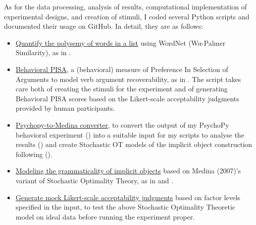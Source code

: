 As for the data processing, analysis of results, computational implementation of experimental designs, and creation of stimuli, I coded several Python scripts and documented their usage on GitHub. In detail, they are as follows:
\begin{itemize}    
    \item \href{https://github.com/giuliacappelli/checkPolysemy}{Quantify the polysemy of words in a list} using WordNet (Wu-Palmer Similarity), as in .
    \item \href{https://github.com/giuliacappelli/behavioralPISA}{Behavioral PISA}, a (behavioral) measure of Preference In Selection of Arguments to model verb argument recoverability, as in . The script takes care both of creating the stimuli for the experiment and of generating Behavioral PISA scores based on the Likert-scale acceptability judgments provided by human participants.
    \item \href{https://github.com/giuliacappelli/PsychopyToMedina}{Psychopy-to-Medina converter}, to convert the output of my PsychoPy behavioral experiment () into a suitable input for my scripts to analyse the results () and create Stochastic OT models of the implicit object construction following \textcite{Medina2007} ().
    \item \href{https://github.com/giuliacappelli/MedinaStochasticOptimalityTheory}{Modeling the grammaticality of implicit objects} based on Medina (2007)'s variant of Stochastic Optimality Theory, as in  and .
    \item \href{https://github.com/giuliacappelli/generateMockLikertGrammaticalityJudgments}{Generate mock Likert-scale acceptability judgments} based on factor levels specified in the input, to test the above Stochastic Optimality Theoretic model on ideal data before running the experiment proper.
\end{itemize}


